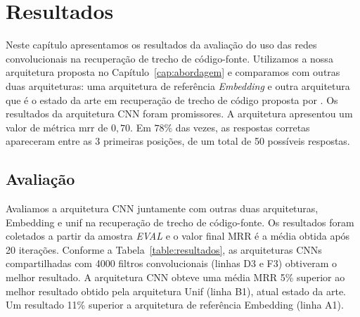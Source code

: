 \chapter{Resultados}
\label{cap:resultados}

Neste capítulo apresentamos os resultados da avaliação do uso das redes convolucionais na recuperação de trecho de código-fonte. Utilizamos a nossa arquitetura proposta no Capítulo~\ref{cap:abordagem} e comparamos com outras duas arquiteturas: uma arquitetura de referência \textit{Embedding} e outra arquitetura que é o estado da arte em recuperação de trecho de código proposta por \cite{cambronero-deep-learning-code-search:2019}. Os resultados da arquitetura CNN foram promissores. A arquitetura apresentou um valor de métrica \acrfull{mrr} de $0,70$. Em $78\%$ das vezes, as respostas corretas apareceram entre as 3 primeiras posições, de um total de 50 possíveis respostas.

\section{Avaliação}
\label{sec:resultados-avaliacao}

Avaliamos a arquitetura CNN juntamente com outras duas arquiteturas, Embedding e \Gls{unif} na recuperação de trecho de código-fonte. Os resultados foram coletados a partir da amostra \emph{EVAL} e o valor final MRR é a média obtida após 20 iterações. Conforme a Tabela~\ref{table:resultados}, as arquiteturas CNNs compartilhadas com 4000 filtros convolucionais (linhas D3 e F3) obtiveram o melhor resultado. A arquitetura CNN obteve uma média MRR 5\% superior ao melhor resultado obtido pela arquitetura Unif (linha B1), atual estado da arte. Um resultado 11\% superior a arquitetura de referência Embedding (linha A1). 

